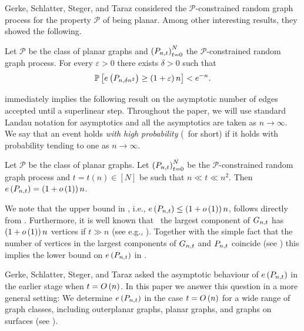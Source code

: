 Gerke, Schlatter, Steger, and Taraz \cite{GerkeSchlatterStegerTaraz2008} considered the $\mathcal{P}$-constrained random graph process for the property $\mathcal{P}$ of being planar. Among other interesting results, they showed the following.

\begin{thm}\label{PPthm:Gerke}
Let $\mathcal{P}$ be the class of planar graphs and $\left(P_{n,t}\right)_{t=0}^{N}$ the $\mathcal{P}$-constrained random graph process. For every $\varepsilon>0$ there exists $\delta>0$ such that
\begin{align*}
\mathbb{P}\left[e\left({P_{n,\delta n^2}}\right)\geq \left(1+\varepsilon\right)n\right]<e^{-n}.
\end{align*}
\end{thm}

 immediately implies the following result on the asymptotic number of edges accepted until a superlinear step. Throughout the paper, we will use standard Landau notation for asymptotics and all the asymptotics are taken as $n\to \infty$. We say that an event holds {\em with high probability} (\whp\ for short) if it holds with probability tending to one as $n\to\infty$.
	
\begin{coro}\label{PPcoro:numberEdges}
Let $\mathcal{P}$ be the class of planar graphs. Let $\left(P_{n,t}\right)_{t=0}^{N}$ be the $\mathcal{P}$-constrained random graph process and $t=t(n)\in\left[N\right]$ be such that $n\ll t\ll n^2$. Then \whp\ $e\left({P_{n,t}}\right)=\left(1+o\left(1\right)\right)n$.
\end{coro}

We note that the upper bound in , i.e., $e\left({P_{n,t}}\right)\leq \left(1+o\left(1\right)\right)n$, follows directly from . Furthermore, it is well known that \whp\ the largest component of $G_{n,t}$ has $\left(1+o\left(1\right)\right)n$ vertices if $t\gg n$ (see e.g., \cite{ErdoesRenyi1960}). Together with the simple fact that the number of vertices in the largest components of $G_{n,t}$ and $P_{n,t}$ coincide (see ) this implies the lower bound on $e\left({P_{n,t}}\right)$ in .

Gerke, Schlatter, Steger, and Taraz asked the asymptotic behaviour of $e\left({P_{n,t}}\right)$ in the earlier stage when $t=O\left(n\right)$. In this paper we answer this question in a more general setting: We determine $e\left({P_{n,t}}\right)$ in the case $t=O\left(n\right)$ for a wide range of graph classes, including outerplanar graphs, planar graphs, and graphs on surfaces (see ).

